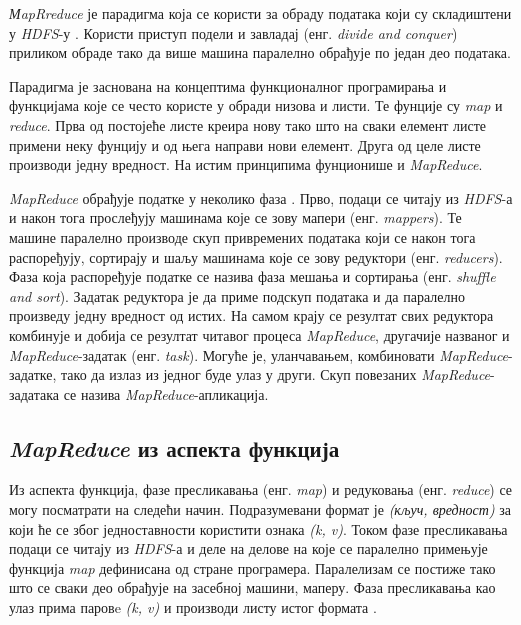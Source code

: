 \documentclass[12pt,oneside]{memoir}
\begin{document}
\textit{МapRreduce} је парадигма која се користи за обраду података који су складиштени у \textit{HDFS}-у \cite{hadoop_beginner}. Користи приступ подели и завладај (енг. \textit{divide and conquer}) приликом обраде тако да више машина паралелно обрађује по један део података.

Парадигма је заснована на концептима функционалног програмирања и функцијама које се често користе у обради низова и листи. Те фунције су \textit{map} и \textit{reduce}. Прва од постојеће листе креира нову тако што на сваки елемент листе примени неку фунцију и од њега направи нови елемент. Друга од целе листе производи једну вредност. На истим принципима фунционише и \textit{MapReduce}.

\textit{MapReduce} обрађује податке у неколико фаза \cite{hadoop_learning}. Прво, подаци се читају из \textit{HDFS}-а и након тога прослеђују машинама које се зову мапери (енг. \textit{mappers}). Те машине паралелно производе скуп привремених података који се након тога распоређују, сортирају и шаљу машинама које се зову редуктори (енг. \textit{reducers}). Фаза која распоређује податке се назива фаза мешања и сортирања (енг. \textit{shuffle and sort}). Задатак редуктора је да приме подскуп података и да паралелно произведу једну вредност од истих. На самом крају се резултат свих редуктора комбинује и добија се резултат читавог процеса \textit{MapReduce}, другачије названог и \textit{MapReduce}-задатак (енг. \textit{task}). Могуће је, уланчавањем, комбиновати \textit{MapReduce}-задатке, тако да излаз из једног буде улаз у други. Скуп повезаних \textit{MapReduce}-задатака се назива \textit{MapReduce}-апликација.

\subsection{\textit{MapReduce} из аспекта функција}
\label{subsec:mr_funck_asp}

Из аспекта функција, фазе пресликавања (енг. \textit{map}) и редуковања (енг. \textit{reduce}) се могу посматрати на следећи начин. Подразумевани формат је \textit{(кључ, вредност)} за који ће се због једноставности користити ознака \textit{(k, v)}. Током фазе пресликавања подаци се читају из \textit{HDFS}-а и деле на делове на које се паралелно примењује функција \textit{map} дефинисана од стране програмера. Паралелизам се постиже тако што се сваки део обрађује на засебној машини, маперу. Фаза пресликавања као улаз прима паровe \textit{(k, v)} и производи листу истог формата \cite{hadoop_learning}.
\end{document}
